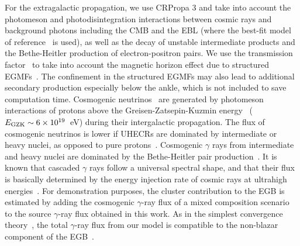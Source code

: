 \documentclass[aps,prd,onecolumn,superscriptaddress,11pt]{revtex4}
\begin{document}
For the extragalactic propagation, we use CRPropa 3 and take into account the photomeson and photodisintegration interactions between cosmic rays and background photons including the CMB and the EBL (where the best-fit model of reference~\cite{2004A&A...413..807K} is used), as well as the decay of unstable intermediate products and the Bethe-Heitler production of electron-positron pairs. We use the transmission factor~\cite{Kotera08a} to take into account the magnetic horizon effect due to structured EGMFs~\cite{Lemoine:2004uw,2008ApJ...682...29D, 2014JCAP...11..031A}. The confinement in the structured EGMFs may also lead to additional secondary production especially below the ankle, which is not included to save computation time.
Cosmogenic neutrinos~\cite{Beresinsky:1969qj} are generated by photomeson interactions of protons above the Greisen-Zatsepin-Kuzmin energy~\cite{1966PhRvL..16..748G,1966JETPL...4...78Z} ($E_{\rm GZK}\sim6\times10^{19}$~eV) during their intergalactic propagation. The flux of cosmogenic neutrinos is lower if UHECRs are dominated by intermediate or heavy nuclei, as opposed to pure protons~\cite{2010PhRvD..81l3001M,KO11,Ahlers:2012rz}. Cosmogenic $\gamma$ rays from intermediate and heavy nuclei are dominated by the Bethe-Heitler pair production~\cite{Ahlers:2011sd,Decerprit:2011qe,2012ApJ...749...63M}. It is known that cascaded $\gamma$ rays follow a universal spectral shape, and that their flux is basically determined by the energy injection rate of cosmic rays at ultrahigh energies~\cite{Berezinsky:1975zz,Wang:2011qc,Murase:2012df}.  For demonstration purposes, the cluster contribution to the EGB is estimated by adding the cosmogenic $\gamma$-ray flux of a mixed composition scenario~\cite{Decerprit:2011qe} to the source $\gamma$-ray flux obtained in this work. As in the simplest convergence theory~\cite{2016PhRvD..94j3006M}, the total $\gamma$-ray flux from our model is compatible to the non-blazar component of the EGB~\cite{PhysRevLett.116.151105,Lisanti:2016jub}. 
\end{document}
